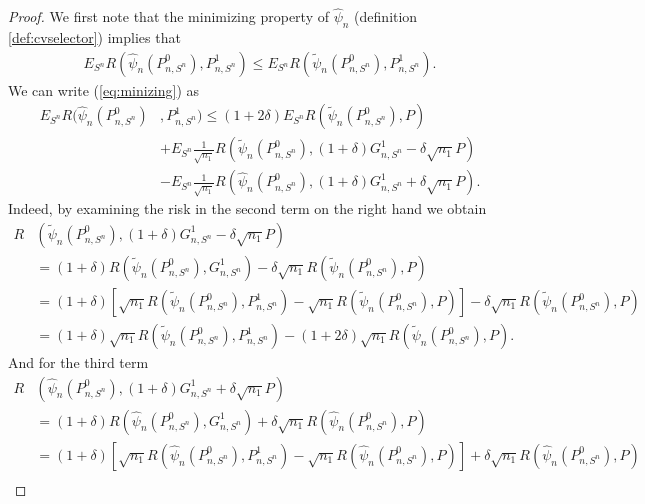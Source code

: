 \documentclass[11pt, a4paper]{article}
\theoremstyle{definition}
\theoremstyle{remark}
\newcommand{\la}{\psi}
\newcommand{\Sn}{S^n}
\begin{document}
\begin{proof}
    We first note that the minimizing property of $ \hat{\la}_n $ (definition \ref{def:cvselector}) implies that 
    \begin{align}
        E_{\Sn} R( \hat{\la}_n(P_{n, \Sn}^{0}), P_{n, \Sn}^{1} ) \leq E_{\Sn} R( \tilde{\la}_n(P_{n, \Sn}^{0}) , P_{n, \Sn}^{1}  ). \label{eq:minizing} 
    \end{align}
   We can write (\ref{eq:minizing}) as  
   \begin{align*}
       E_{\Sn} R( \hat{\la}_n(P_{n, \Sn}^{0} )&, P_{n, \Sn}^{1}) \leq (1 + 2 \delta) E_{\Sn} R( \tilde{\la}_n(P_{n, \Sn}^{0}) , P ) \\ 
               &+E_{\Sn} \frac{1}{\sqrt{n_1} } R(\tilde{\la}_n (P_{n, \Sn}^{0}), (1 + \delta) G_{n,\Sn}^{1} - \delta \sqrt{n_1} P)\\
               &-E_{\Sn} \frac{1}{\sqrt{n_1} } R(\hat{\la}_n(P_{n, \Sn}^{0}), (1 + \delta) G_{n,\Sn}^{1} + \delta \sqrt{n_1} P)  .
   \end{align*}
  Indeed, by examining the risk in the second term on the right hand we obtain 
  \begin{align*}
      R&(\tilde{\la}_n (P_{n, \Sn}^{0}), (1 + \delta) G_{n,\Sn}^{1} - \delta \sqrt{n_1} P)\\
                    &= (1 + \delta) R(\tilde{\la}_n (P_{n, \Sn}^{0}), G_{n,\Sn}^{1}) - \delta \sqrt{n_1} R(\tilde{\la}_n (P_{n, \Sn}^{0}), P) \\ 
                    &= (1 + \delta) \left[\sqrt{n_1} R(\tilde{\la}_n (P_{n, \Sn}^{0}), P_{n,\Sn}^{1}) - \sqrt{n_1} R(\tilde{\la}_n (P_{n, \Sn}^{0}), P)\right] - \delta \sqrt{n_1} R(\tilde{\la}_n (P_{n, \Sn}^{0}), P)\\ 
                    &= (1 + \delta) \sqrt{n_1} R(\tilde{\la}_n (P_{n, \Sn}^{0}), P_{n,\Sn}^{1}) - (1 + 2\delta)\sqrt{n_1}   R(\tilde{\la}_n (P_{n, \Sn}^{0}), P).
  \end{align*}
  And for the third term 
  \begin{align*}
     R&(\hat{\la}_n(P_{n, \Sn}^{0}), (1 + \delta) G_{n,\Sn}^{1} + \delta \sqrt{n_1} P)\\
       &= (1 + \delta) R(\hat{\la}_n (P_{n, \Sn}^{0}), G_{n,\Sn}^{1}) + \delta \sqrt{n_1} R(\hat{\la}_n (P_{n, \Sn}^{0}), P) \\ 
       &= (1 + \delta) \left[\sqrt{n_1} R(\hat{\la}_n (P_{n, \Sn}^{0}), P_{n,\Sn}^{1}) - \sqrt{n_1} R(\hat{\la}_n (P_{n, \Sn}^{0}), P)\right] + \delta \sqrt{n_1} R(\hat{\la}_n (P_{n, \Sn}^{0}), P)\\ 

\end{align*}
\end{proof}
\end{document}
